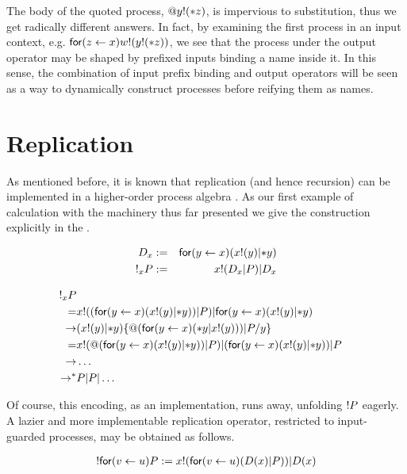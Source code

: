The body of the quoted process, $\quotep{\lift{y}{\dropn{z}}}$, is
impervious to substitution, thus we get radically different
answers. In fact, by examining the first process in an input context,
e.g. $\mathsf{for}(z \leftarrow x)\lift{w}{\lift{y}{\dropn{z}}}$, we see that the process
under the output operator may be shaped by prefixed inputs binding a
name inside it. In this sense, the combination of input prefix binding
and output operators will be seen as a way to dynamically construct
processes before reifying them as names.

\section{Replication}

As mentioned before, it is known that replication (and hence
recursion) can be implemented in a higher-order process algebra
\cite{SangiorgiWalker}. As our first example of calculation with the
machinery thus far presented we give the construction explicitly in
the {\rhoc}.

\begin{eqnarray}
	D_{x} & := & \prefix{x}{y}{(\binpar{\outputp{x}{y}}{\dropn{y}})} \nonumber\\
	\bangp_{x}{P} & := & \binpar{\lift{x}{\binpar{D_{x}}{P}}}{D_{x}} \nonumber
\end{eqnarray}

\begin{eqnarray}
	\bangp_{x}{P} & & \nonumber\\
	=
	& \lift{x}{(\prefix{x}{y}{(\outputp{x}{y} | \dropn{y})) | P}} 
	      | \prefix{x}{y}{(\outputp{x}{y} | \dropn{y})} & \nonumber\\
	\red
	& (\outputp{x}{y} | \dropn{y})\substn{\quotep{(\prefix{x}{y}{(\dropn{y} | \outputp{x}{y})) | P}}}{y} & \nonumber\\
	=
	& \outputp{x}{\quotep{(\prefix{x}{y}{(\outputp{x}{y} | \dropn{y})) | P}}}
	  | {(\prefix{x}{y}{(\outputp{x}{y} | \dropn{y})) | P}} & \nonumber\\
	\red
	& \ldots & \nonumber\\
	\red^*
	& P | P | \ldots & \nonumber
\end{eqnarray}

Of course, this encoding, as an implementation, runs away, unfolding
$\bangp{P}$ eagerly. A lazier and more implementable replication
operator, restricted to input-guarded processes, may be obtained as follows.

\begin{eqnarray}
\bangp{\prefix{u}{v}{P}} 
	:= 
	\binpar{\lift{x}{\prefix{u}{v}{(\binpar{D(x)}{P})}}}{D(x)} \nonumber
\end{eqnarray}


